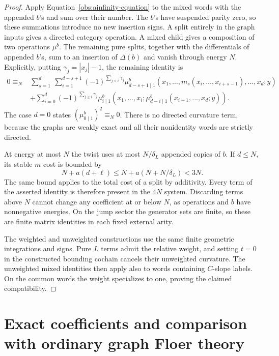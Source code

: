 \documentclass[11pt]{article}
\theoremstyle{definition}
\theoremstyle{remark}
\numberwithin{equation}{section}
\begin{document}
\begin{proof}
Apply Equation~\eqref{obs:ainfinity-equation} to the mixed
words with the appended $b$'s and sum over their number.
The $b$'s have suspended parity zero, so these summations
introduce no new insertion signs.  A split entirely in the
graph inputs gives a directed category operation.  A mixed
child gives a composition of two operations $\mu^b$.
The remaining pure splits, together with the differentials
of appended $b$'s, sum to an insertion of $\Delta(b)$ and
vanish through energy $N$.  Explicitly, putting
$\gamma_j=|x_j|-1$, the remaining identity is
\begin{align*}
0\equiv_N{}&
 \sum_{s=1}^{d}\ \sum_{i=1}^{d-s+1}
 (-1)^{\sum_{j<i}\gamma_j}
 \mu^b_{d-s+1\mid1}
    (x_1,\ldots,m_s(x_i,\ldots,x_{i+s-1}),\ldots,x_d;y)\\
 &+\sum_{i=0}^{d}(-1)^{\sum_{j\le i}\gamma_j}
 \mu^b_{i\mid1}
    (x_1,\ldots,x_i;
       \mu^b_{d-i\mid1}(x_{i+1},\ldots,x_d;y)).
\end{align*}
The case $d=0$ states $(\mu^b_{0\mid1})^2\equiv_N0$.
There is no directed curvature term, because the graphs
are weakly exact and all their nonidentity words are
strictly directed.

At energy at most $N$ the twist uses at most
$N/\delta_L$ appended copies of $b$.  If $d\le N$, its
stable $m$ cost is bounded by
\[
 N+a(d+\ell)\le N+a(N+N/\delta_L)<3N.
\]
The same bound applies to the total cost of a split by
additivity.  Every term of the asserted identity is
therefore present in the $4N$ system.  Discarding terms
above $N$ cannot change any coefficient at or below $N$,
as operations and $b$ have nonnegative energies.  On the
jump sector the generator sets are finite, so these are
finite matrix identities in each fixed external arity.

The weighted and unweighted constructions use the same
finite geometric integrations and signs.  Pure $L$ terms
admit the relative weight, and setting $t=0$ in the
constructed bounding cochain cancels their unweighted
curvature.  The unweighted mixed identities then apply
also to words containing $C$-slope labels.  On the common
words the weight specializes to one, proving the claimed
compatibility.
\end{proof}

\section{Exact coefficients and comparison with ordinary graph Floer theory}
\label{cat:section}
\end{document}
